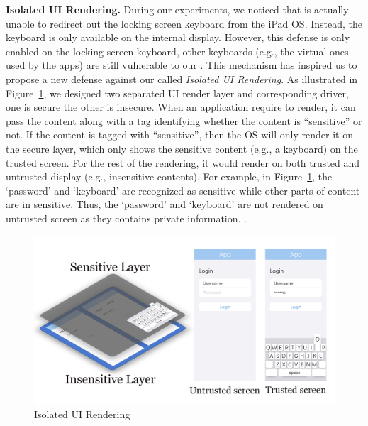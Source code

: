 \textbf{Isolated UI Rendering.} During our experiments, we noticed that \tool
is actually unable to redirect out the locking screen keyboard from the iPad
OS. Instead, the keyboard is only available on the internal display. However,
this defense is only enabled on the locking screen keyboard, other keyboards
(e.g., the virtual ones used by the apps) are still vulnerable to our \tool.
This mechanism has inspired us to propose a new defense against our \tool
called \emph{Isolated UI Rendering}. As illustrated in
Figure~\ref{fig:isolated_ui}, we designed two separated UI render layer and corresponding driver, one
is secure the other is insecure. When an application require to render, it can
pass the content along with a tag identifying whether the content is
``sensitive'' or not. If the content is tagged with ``sensitive'', then the OS
will only render it on the secure layer, which only shows the sensitive content
(e.g., a keyboard) on the trusted screen. For the rest of the rendering, it
would render on both trusted and untrusted display (e.g., insensitive
contents).
For example, in Figure~\ref{fig:isolated_ui}, the `password' and `keyboard' are recognized as sensitive while other parts of content are in sensitive. Thus, the `password' and `keyboard' are not rendered on untrusted screen as they contains private information.
 .

\begin{figure}[t]
	\centering
	\includegraphics[width=\linewidth]{./Figs/isolated_ui.png}
	\caption{Isolated UI Rendering}%
	\label{fig:isolated_ui}
\end{figure}
